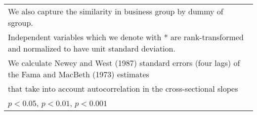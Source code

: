 {\begin{tabular}{l*{7}{c}}
\multicolumn{8}{l}{\footnotesize We also capture the similarity in business group by dummy of sgroup.}\\
\multicolumn{8}{l}{\footnotesize Independent variables which  we denote with * are rank-transformed and normalized to have unit standard deviation.}\\
\multicolumn{8}{l}{\footnotesize  We calculate Newey and West (1987) standard errors (four lags) of the Fama and MacBeth (1973) estimates }\\
\multicolumn{8}{l}{\footnotesize  that take into account autocorrelation in the cross-sectional slopes}\\
\multicolumn{8}{l}{\footnotesize \sym{*} \(p<0.05\), \sym{**} \(p<0.01\), \sym{***} \(p<0.001\)}\\
\end{tabular}
}
